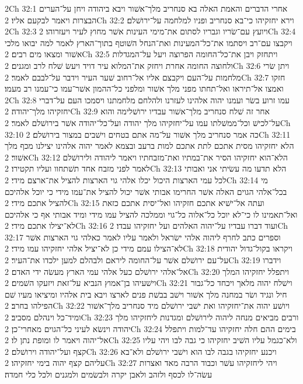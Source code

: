 2Ch 32:1  אחרי הדברים והאמת האלה בא סנחריב מלך־אשׁור ויבא ביהודה ויחן על־הערים הבצרות ויאמר לבקעם אליו׃
2Ch 32:2  וירא יחזקיהו כי־בא סנחריב ופניו למלחמה על־ירושׁלם׃
2Ch 32:3  ויועץ עם־שׂריו וגבריו לסתום את־מימי העינות אשׁר מחוץ לעיר ויעזרוהו׃
2Ch 32:4  ויקבצו עם־רב ויסתמו את־כל־המעינות ואת־הנחל השׁוטף בתוך־הארץ לאמר למה יבואו מלכי אשׁור ומצאו מים רבים׃
2Ch 32:5  ויתחזק ויבן את־כל־החומה הפרוצה ויעל על־המגדלות ולחוצה החומה אחרת ויחזק את־המלוא עיר דויד ויעשׂ שׁלח לרב ומגנים׃
2Ch 32:6  ויתן שׂרי מלחמות על־העם ויקבצם אליו אל־רחוב שׁער העיר וידבר על־לבבם לאמר׃
2Ch 32:7  חזקו ואמצו אל־תיראו ואל־תחתו מפני מלך אשׁור ומלפני כל־ההמון אשׁר־עמו כי־עמנו רב מעמו׃
2Ch 32:8  עמו זרוע בשׂר ועמנו יהוה אלהינו לעזרנו ולהלחם מלחמתנו ויסמכו העם על־דברי יחזקיהו מלך־יהודה׃
2Ch 32:9  אחר זה שׁלח סנחריב מלך־אשׁור עבדיו ירושׁלימה והוא על־לכישׁ וכל־ממשׁלתו עמו על־יחזקיהו מלך יהודה ועל־כל־יהודה אשׁר בירושׁלם לאמר׃
2Ch 32:10  כה אמר סנחריב מלך אשׁור על־מה אתם בטחים וישׁבים במצור בירושׁלם׃
2Ch 32:11  הלא יחזקיהו מסית אתכם לתת אתכם למות ברעב ובצמא לאמר יהוה אלהינו יצילנו מכף מלך אשׁור׃
2Ch 32:12  הלא־הוא יחזקיהו הסיר את־במתיו ואת־מזבחתיו ויאמר ליהודה ולירושׁלם לאמר לפני מזבח אחד תשׁתחוו ועליו תקטירו׃
2Ch 32:13  הלא תדעו מה עשׂיתי אני ואבותי לכל עמי הארצות היכול יכלו אלהי גוי הארצות להציל את־ארצם מידי׃
2Ch 32:14  מי בכל־אלהי הגוים האלה אשׁר החרימו אבותי אשׁר יכול להציל את־עמו מידי כי יוכל אלהיכם להציל אתכם מידי׃
2Ch 32:15  ועתה אל־ישׁיא אתכם חזקיהו ואל־יסית אתכם כזאת ואל־תאמינו לו כי־לא יוכל כל־אלוה כל־גוי וממלכה להציל עמו מידי ומיד אבותי אף כי אלהיכם לא־יצילו אתכם מידי׃
2Ch 32:16  ועוד דברו עבדיו על־יהוה האלהים ועל יחזקיהו עבדו׃
2Ch 32:17  וספרים כתב לחרף ליהוה אלהי ישׂראל ולאמר עליו לאמר כאלהי גוי הארצות אשׁר לא־הצילו עמם מידי כן לא־יציל אלהי יחזקיהו עמו מידי׃
2Ch 32:18  ויקראו בקול־גדול יהודית על־עם ירושׁלם אשׁר על־החומה ליראם ולבהלם למען ילכדו את־העיר׃
2Ch 32:19  וידברו אל־אלהי ירושׁלם כעל אלהי עמי הארץ מעשׂה ידי האדם׃
2Ch 32:20  ויתפלל יחזקיהו המלך וישׁעיהו בן־אמוץ הנביא על־זאת ויזעקו השׁמים׃
2Ch 32:21  וישׁלח יהוה מלאך ויכחד כל־גבור חיל ונגיד ושׂר במחנה מלך אשׁור וישׁב בבשׁת פנים לארצו ויבא בית אלהיו ומיציאו מעיו שׁם הפילהו בחרב׃
2Ch 32:22  ויושׁע יהוה את־יחזקיהו ואת ישׁבי ירושׁלם מיד סנחריב מלך־אשׁור ומיד־כל וינהלם מסביב׃
2Ch 32:23  ורבים מביאים מנחה ליהוה לירושׁלם ומגדנות ליחזקיהו מלך יהודה וינשׂא לעיני כל־הגוים מאחרי־כן׃
2Ch 32:24  בימים ההם חלה יחזקיהו עד־למות ויתפלל אל־יהוה ויאמר לו ומופת נתן לו׃
2Ch 32:25  ולא־כגמל עליו השׁיב יחזקיהו כי גבה לבו ויהי עליו קצף ועל־יהודה וירושׁלם׃
2Ch 32:26  ויכנע יחזקיהו בגבה לבו הוא וישׁבי ירושׁלם ולא־בא עליהם קצף יהוה בימי יחזקיהו׃
2Ch 32:27  ויהי ליחזקיהו עשׁר וכבוד הרבה מאד ואצרות עשׂה־לו לכסף ולזהב ולאבן יקרה ולבשׂמים ולמגנים ולכל כלי חמדה׃
